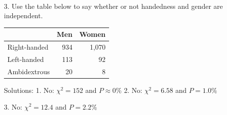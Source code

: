 \documentclass[10pt]{article}
\begin{document}
\vfill
\eject
{\ }

3. Use the table below to say whether or not handedness and gender are independent.

\begin{tabular}{|lrr|}\hline
& Men & Women\vphantom{\Large Y}\\\hline
Right-handed & 934 & 1,070\vphantom{\Large Y}\\
Left-handed  & 113 & 92\\
Ambidextrous & 20 & 8\\\hline
\end{tabular}
%
%
% 
\vfill

Solutions: 
1.  No: $\chi^2=152$ and $P\approx 0\%$ \hspace{20pt} 
2. No: $\chi^2=6.58$ and $P=1.0\%$\hspace{20pt} 

3. No: $\chi^2=12.4$ and $P=2.2\%$
\eject
\end{document}

